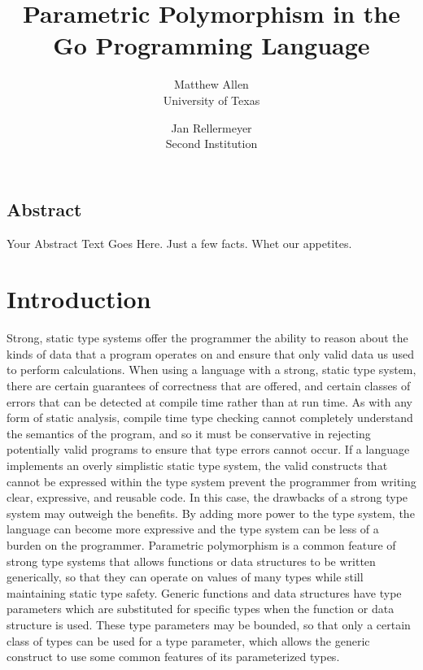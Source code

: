 \documentclass[letterpaper,twocolumn,10pt]{article}
\begin{document}
\date{}

\title{\Large \bf Parametric Polymorphism in the Go Programming Language}

\author{
  {\rm Matthew Allen}\\
  University of Texas
  \and
  {\rm Jan Rellermeyer}\\
  Second Institution
}

\maketitle

\thispagestyle{empty}


\subsection*{Abstract}
Your Abstract Text Goes Here.  Just a few facts.
Whet our appetites.

\section{Introduction} \label{introduction}

Strong, static type systems offer the programmer the ability to reason about the kinds of data that a program operates on and ensure that only valid data us used to perform calculations. When using a language with a strong, static type system, there are certain guarantees of correctness that are offered, and certain classes of errors that can be detected at compile time rather than at run time. As with any form of static analysis, compile time type checking cannot completely understand the semantics of the program, and so it must be conservative in rejecting potentially valid programs to ensure that type errors cannot occur. If a language implements an overly simplistic static type system, the valid constructs that cannot be expressed within the type system prevent the programmer from writing clear, expressive, and reusable code. In this case, the drawbacks of a strong type system may outweigh the benefits. By adding more power to the type system, the language can become more expressive and the type system can be less of a burden on the programmer. Parametric polymorphism is a common feature of strong type systems that allows functions or data structures to be written generically, so that they can operate on values of many types while still maintaining static type safety. Generic functions and data structures have type parameters which are substituted for specific types when the function or data structure is used. These type parameters may be bounded, so that only a certain class of types can be used for a type parameter, which allows the generic construct to use some common features of its parameterized types.
\end{document}
